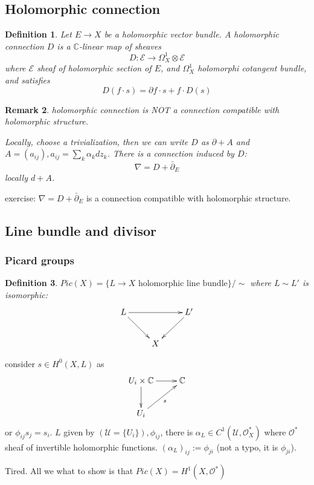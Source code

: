 \documentclass{article}
\newtheorem{definition}{Definition}[subsection]
\newtheorem{remark}[definition]{Remark}
\begin{document}
\subsection{Holomorphic connection}
\begin{definition}
  Let $E\to X$ be a holomorphic vector bundle. A holomorphic connection $D$ is a $\mathbb{C}$-linear map of sheaves
  \[
    D:\mathcal{E} \to \Omega_{X}^{1} \otimes\mathcal{E}
  \]
  where $\mathcal{E}$ sheaf of holomorphic section of  $E$, and $\Omega_{X}^{1}$ holomorphi cotangent bundle, and satisfies
  \[
    D(f \cdot s)= \partial f \cdot s + f \cdot D(s)
  \]
\end{definition}
\begin{remark}
  holomorphic connection is NOT a connection compatible with holomorphic structure.
  
  Locally, choose a trivialization, then we can write $D$ as $ \partial + A $ and $ A=(a_{ij}), a_{ij}=\sum_{k}\alpha_{k}dz_{k} $. There is a connection induced by $D $:
  \[
    \nabla = D + \bar{\partial}_{E}
  \]
  locally $ d+A $.
\end{remark}
exercise: $ \nabla = D + \bar{\partial}_{E} $ is a connection compatible with holomorphic structure.
\subsection{Line bundle and divisor}
\subsubsection{Picard groups}
\begin{definition}
  $ Pic(X)= \{ L\to X \text{ holomorphic line bundle}\}/\sim  $ where $ L \sim L' $ is isomorphic:
  \[
  \xymatrix{
    L\ar[rr]\ar[rd]& &L'\ar[ld] \\
  & X&
  }
  \]
\end{definition}
consider $ s\in H^{0}(X,L) $ as
\[
  \xymatrix{
    U_{i} \times \mathbb{C}\ar[r]\ar[d]& \mathbb{C}  \\
    U_{i}\ar[ur]_{s}& 
  }
\]
or $ \phi_{ij}s_{j}=s_{i} $. $L$ given by $ (\mathcal{U}=\{U_{i}\} ), \phi_{ij} $, there is $ \alpha_{L}\in C^{1}(\mathcal{U},\mathcal{O}_{X}^{*}) $ where $ \mathcal{O}^{*} $ sheaf of invertible holomorphic functions. $ (\alpha_{L})_{ij}:= \phi_{ji} $ (not a typo, it is $ \phi_{ji} $).

Tired. All we what to show is that $ Pic(X)=H^{1}(X,\mathcal{O}^{*}) $
\end{document}
